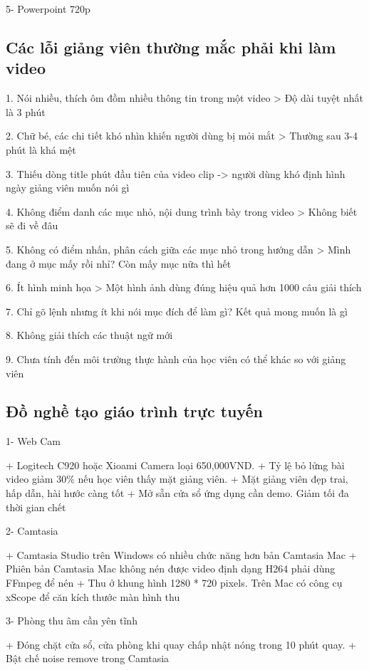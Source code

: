 5- Powerpoint 720p

\subsection{Các lỗi giảng viên thường mắc phải khi làm video}

1. Nói nhiều, thích ôm đồm nhiều thông tin trong một video > Độ dài tuyệt nhất là 3 phút

2. Chữ bé, các chi tiết khó nhìn khiến người dùng bị mỏi mắt > Thường sau 3-4 phút là khá mệt

3. Thiếu dòng title phút đầu tiên của video clip -> người dùng khó định hình ngày giảng viên muốn nói gì

4. Không điểm danh các mục nhỏ, nội dung trình bày trong video > Không biết sẽ đi về đâu

5. Không có điểm nhấn, phân cách giữa các mục nhỏ trong hướng dẫn > Mình đang ở mục mấy rồi nhỉ? Còn mấy mục nữa thì hết

6. Ít hình minh họa > Một hình ảnh dùng đúng hiệu quả hơn 1000 câu giải thích

7. Chỉ gõ lệnh nhưng ít khi nói mục đích để làm gì? Kết quả mong muốn là gì

8. Không giải thích các thuật ngữ mới

9. Chưa tính đến môi trường thực hành của học viên có thể khác so với giảng viên

\subsection{Đồ nghề tạo giáo trình trực tuyến}

1- Web Cam

+ Logitech C920 hoặc Xioami Camera loại 650,000VND.
+ Tỷ lệ bỏ lửng bài video giảm 30\% nếu học viên thấy mặt giảng viên.
+ Mặt giảng viên đẹp trai, hấp dẫn, hài hước càng tốt
+ Mở sẵn cửa sổ ứng dụng cần demo. Giảm tối đa thời gian chết

2- Camtasia

+ Camtasia Studio trên Windows có nhiều chức năng hơn bản Camtasia Mac
+ Phiên bản Camtasia Mac không nén được video định dạng H264 phải dùng FFmpeg để nén
+ Thu ở khung hình 1280 * 720 pixels. Trên Mac có công cụ xScope để căn kích thước màn hình thu

3- Phòng thu âm cần yên tĩnh

+ Đóng chặt cửa sổ, cửa phòng khi quay chấp nhật nóng trong 10 phút quay.
+ Bật chế noise remove trong Camtasia

